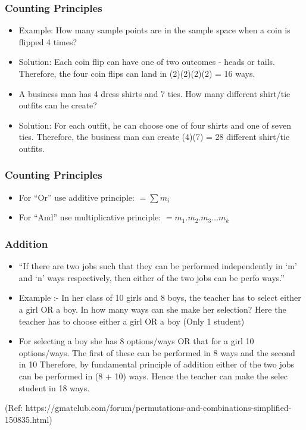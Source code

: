 \begin{frame}[fragile]\frametitle{Counting Principles}

\begin{itemize}
\item Example: How many sample points are in the sample space when a coin is flipped 4 times?
\item Solution: Each coin flip can have one of two outcomes - heads or tails. Therefore, the four coin flips can land in (2)(2)(2)(2) = 16 ways.
\item A business man has 4 dress shirts and 7 ties. How many different shirt/tie outfits can he create?
\item Solution: For each outfit, he can choose one of four shirts and one of seven ties. Therefore, the business man can create (4)(7) = 28 different shirt/tie outfits.
\end{itemize}

\end{frame}



\begin{frame}[fragile]\frametitle{Counting Principles}
\begin{itemize}
\item For ``Or'' use additive principle: $= \sum m_i$
\item For ``And'' use multiplicative principle: $= m_1.m_2.m_3 \ldots m_k$
\end{itemize}

\end{frame}

\begin{frame}[fragile]\frametitle{Addition}
\begin{itemize}
\item ``If there are two jobs such that they can be performed independently in ‘m’ and ‘n’ ways respectively, then either of the two jobs can be perfo
ways.''
 \item Example :- In her class of 10 girls and 8 boys, the teacher has to select either a girl OR a boy. In how many ways can she make her selection?
 Here the teacher has to choose either a girl OR a boy (Only 1 student)
 \item For selecting a boy she has 8 options/ways OR that for a girl 10 options/ways. The first of these can be performed in 8 ways and the second in 10
Therefore, by fundamental principle of addition either of the two jobs can be performed in (8 + 10) ways. Hence the teacher can make the selec
student in 18 ways.
 \end{itemize}
 
 (Ref: https://gmatclub.com/forum/permutations-and-combinations-simplified-150835.html)
\end{frame}


